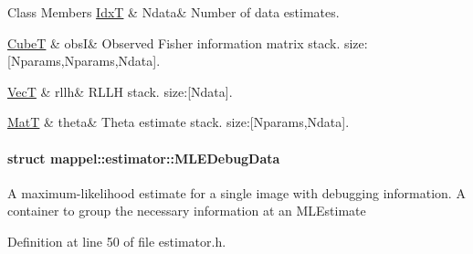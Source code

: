 \begin{DoxyFields}{Class Members}
\hyperlink{namespacemappel_ab17ec0f30b61ece292439d7ece81d3a8}{IdxT}\hypertarget{namespacemappel_1_1estimator_a7b3a27ef73e2603b2832e007899eb81e}{}\label{namespacemappel_1_1estimator_a7b3a27ef73e2603b2832e007899eb81e}
&
Ndata&
Number of data estimates. \\
\hline

\hyperlink{namespacemappel_ab2afab4e6c8805e83946670d882768c2}{CubeT}\hypertarget{namespacemappel_1_1estimator_a4a38be2455df942ae6b9d4c7b42db3cf}{}\label{namespacemappel_1_1estimator_a4a38be2455df942ae6b9d4c7b42db3cf}
&
obsI&
Observed Fisher information matrix stack. size\+:\mbox{[}Nparams,Nparams,Ndata\mbox{]}. \\
\hline

\hyperlink{namespacemappel_a2225ad69f358daa3f4f99282a35b9a3a}{VecT}\hypertarget{namespacemappel_1_1estimator_a70057c57635872bf7edefd7926f49f5e}{}\label{namespacemappel_1_1estimator_a70057c57635872bf7edefd7926f49f5e}
&
rllh&
R\+L\+LH stack. size\+:\mbox{[}Ndata\mbox{]}. \\
\hline

\hyperlink{namespacemappel_a7091ab87c528041f7e2027195fad8915}{MatT}\hypertarget{namespacemappel_1_1estimator_a076aeb06b77af53997525f146739069d}{}\label{namespacemappel_1_1estimator_a076aeb06b77af53997525f146739069d}
&
theta&
Theta estimate stack. size\+:\mbox{[}Nparams,Ndata\mbox{]}. \\
\hline

\end{DoxyFields}
\label{structmappel_1_1estimator_1_1MLEDebugData}
\hypertarget{namespacemappel_1_1estimator_structmappel_1_1estimator_1_1MLEDebugData}{}
\paragraph{struct mappel\+:\+:estimator\+:\+:M\+L\+E\+Debug\+Data}
A maximum-\/likelihood estimate for a single image with debugging information. A container to group the necessary information at an M\+L\+Estimate 

Definition at line 50 of file estimator.\+h.

